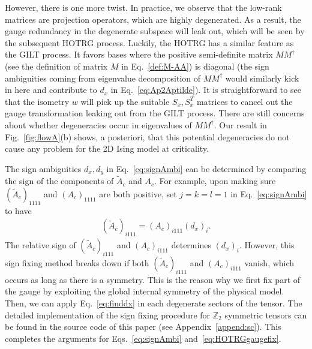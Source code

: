 \documentclass[aps,prr,reprint,superscriptaddress,floatfix]{revtex4-2}
\begin{document}
However, there is one more twist. In practice, we observe that the low-rank matrices are projection operators, which are highly degenerated. 
As a result, the gauge redundancy in the degenerate subspace will leak out, which will be seen by the subsequent HOTRG process. 
Luckily, the HOTRG has a similar feature as the GILT process.
It favors bases where the positive semi-definite matrix $M M^{\dagger}$ (see the definition of matrix $M$ in Eq.~\eqref{def:M-AA}) is diagonal (the sign ambiguities coming from eigenvalue decomposition of $M M^{\dagger}$ would similarly kick in here and contribute to $d_x$ in Eq.~\eqref{eq:Ap2Aptilde}). 
It is straightforward to see that the isometry $w$ will pick up the suitable $S_x,S_x^T$ matrices to cancel out the gauge transformation leaking out from the GILT process.
There are still concerns about whether degeneracies occur in eigenvalues of $M M^{\dagger}$. 
Our result in Fig.~\ref{fig:flowA}(b) shows, a posteriori, that this potential degeneracies do not cause any problem for the 2D Ising model at criticality.
%

The sign ambiguities $d_x,d_y$ in Eq.~\eqref{eq:signAmbi} can be determined by comparing the sign of the components of $\tilde{A}_c$ and $A_c$.
For example, upon making sure $(\tilde{A}_c)_{1111}$ and $(A_c)_{1111}$ are both positive, set $j = k = l = 1$ in Eq.~\eqref{eq:signAmbi} to have
%
\begin{align}\label{eq:finddx}
    (\tilde{A}_c)_{i111} =
    (A_c)_{i111}(d_x)_i. 
\end{align}
%
The relative sign of $(\tilde{A}_c)_{i111}$ and $(A_c)_{i111}$ determines $(d_x)_i$.
However, this sign fixing method breaks down if both $(\tilde{A}_c)_{i111}$ and $(A_c)_{i111}$ vanish, which occurs as long as there is a symmetry.
This is the reason why we first fix part of the gauge by exploiting the global internal symmetry of the physical model.
Then, we can apply Eq.~\eqref{eq:finddx} in each degenerate sectors of the tensor.
The detailed implementation of the sign fixing procedure for $\mathbb{Z}_2$ symmetric tensors can be found in the source code of this paper (see Appendix~\ref{append:sc}).
This completes the arguments for Eqs.~\eqref{eq:signAmbi} and~\eqref{eq:HOTRGgaugefix}.
%
\end{document}
